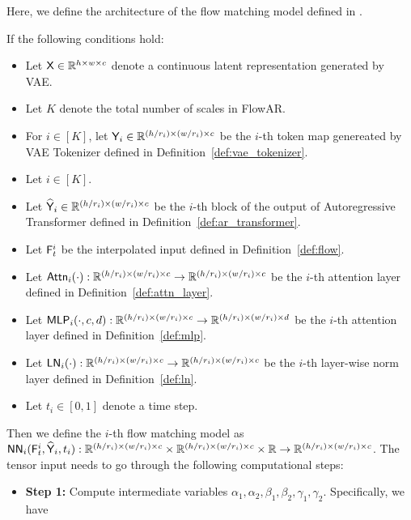 Here, we define the architecture of the flow matching model defined in \cite{ryh+24}.
\begin{definition}\label{def:flow_matching_architecture}
    If the following conditions hold:
    \begin{itemize}

        \item Let $\mathsf{X} \in \mathbb{R}^{h \times w \times c}$ denote a continuous latent representation generated by VAE.
        \item Let $K$ denote the total number of scales in FlowAR.
        \item For $i \in [K]$, let $\mathsf{Y}_i \in \mathbb{R}^{(h / r_i) \times (w/r_i) \times c}$ be the $i$-th token map genereated by VAE Tokenizer defined in Definition~\ref{def:vae_tokenizer}.
        \item Let $i \in [K]$.
        \item Let $\widehat{\mathsf{Y}}_i \in \mathbb{R}^{(h / r_i) \times (w/r_i) \times c}$ be the $i$-th block of the output of Autoregressive Transformer defined in Definition~\ref{def:ar_transformer}.
        \item Let $\mathsf{F}^i_t$ be the interpolated input defined in Definition~\ref{def:flow}.
        \item Let $\mathsf{Attn}_i(\cdot):\mathbb{R}^{(h / r_i) \times (w/r_i) \times c} \to \mathbb{R}^{(h / r_i) \times (w/r_i) \times c}$ be the $i$-th attention layer defined in Definition~\ref{def:attn_layer}.
        \item Let $\mathsf{MLP}_i(\cdot,c,d):\mathbb{R}^{(h / r_i) \times (w/r_i) \times c}  \to \mathbb{R}^{(h / r_i) \times (w/r_i) \times d}$ be the $i$-th attention layer defined in Definition~\ref{def:mlp}.
        \item Let $\mathsf{LN}_i(\cdot): \mathbb{R}^{(h / r_i) \times (w/r_i) \times c}  \to \mathbb{R}^{(h / r_i) \times (w/r_i) \times c}$ be the $i$-th layer-wise norm layer defined in Definition~\ref{def:ln}.
        \item Let $t_i \in [0,1]$ denote a time step.
    \end{itemize}
    Then we define the $i$-th flow matching model as $\mathsf{NN}_i(\mathsf{F}_t^i,\widehat{\mathsf{Y}}_i,t_i): \mathbb{R}^{(h / r_i) \times (w/r_i) \times c} \times \mathbb{R}^{(h / r_i) \times (w/r_i) \times c} \times \mathbb{R} \to \mathbb{R}^{(h / r_i) \times (w/r_i) \times c}$. The tensor input needs to go through the following computational steps:
    \begin{itemize}
        \item {\bf Step 1:} Compute intermediate variables $\alpha_1, \alpha_2, \beta_1, \beta_2, \gamma_1, \gamma_2$. Specifically, we have

\end{itemize}
\end{definition}
